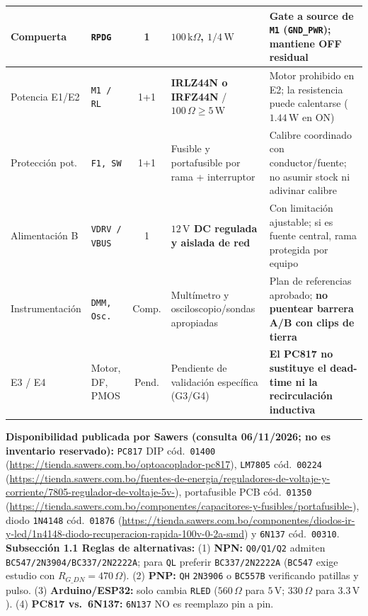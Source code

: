 \documentclass[10pt, a4paper, landscape]{article}
\begin{document}
{\begin{tabularx}{\linewidth}{|>{\raggedright\arraybackslash}p{2.5cm}|>{\raggedright\arraybackslash}p{2.2cm}|c|>{\raggedright\arraybackslash}p{7.4cm}|>{\raggedright\arraybackslash}X|}
Compuerta & \texttt{RPDG} & 1 & \textbf{$100\,\text{k}\Omega$, $1/4\,\text{W}$} & Gate a source de \texttt{M1} (\texttt{GND\_PWR}); mantiene OFF residual \\ \hline
Potencia E1/E2 & \texttt{M1 / RL} & 1+1 & \textbf{IRLZ44N o IRFZ44N} / \textbf{$100\,\Omega \ge 5\,\text{W}$} & Motor prohibido en E2; la resistencia puede calentarse ($1.44\,\text{W}$ en ON) \\ \hline
Protección pot. & \texttt{F1, SW} & 1+1 & Fusible y portafusible por rama + interruptor & Calibre coordinado con conductor/fuente; no asumir stock ni adivinar calibre \\ \hline
Alimentación B & \texttt{VDRV / VBUS} & 1 & \textbf{$12\,\text{V}$ DC regulada y aislada de red} & Con limitación ajustable; si es fuente central, rama protegida por equipo \\ \hline
Instrumentación & \texttt{DMM, Osc.} & Comp. & Multímetro y osciloscopio/sondas apropiadas & Plan de referencias aprobado; \textbf{no puentear barrera A/B con clips de tierra} \\ \hline
E3 / E4 & Motor, DF, PMOS & Pend. & Pendiente de validación específica (G3/G4) & \textbf{El PC817 no sustituye el dead-time ni la recirculación inductiva} \\ \hline
\end{tabularx}
}

\vspace{0.12cm}
\noindent
{\footnotesize \textbf{Disponibilidad publicada por Sawers (consulta 06/11/2026; no es inventario reservado):} \texttt{PC817} DIP cód.\ \texttt{01400} (\url{https://tienda.sawers.com.bo/optoacoplador-pc817}), \texttt{LM7805} cód.\ \texttt{00224} (\url{https://tienda.sawers.com.bo/fuentes-de-energia/reguladores-de-voltaje-y-corriente/7805-regulador-de-voltaje-5v-}), portafusible PCB cód.\ \texttt{01350} (\url{https://tienda.sawers.com.bo/componentes/capacitores-y-fusibles/portafusible-}), diodo \texttt{1N4148} cód.\ \texttt{01876} (\url{https://tienda.sawers.com.bo/componentes/diodos-ir-y-led/1n4148-diodo-recuperacion-rapida-100v-0-2a-smd}) y \texttt{6N137} cód.\ \texttt{00310}. \textbf{Subsección 1.1 Reglas de alternativas:} (1) \textbf{NPN:} \texttt{Q0/Q1/Q2} admiten \texttt{BC547/2N3904/BC337/2N2222A}; para \texttt{QL} preferir \texttt{BC337/2N2222A} (\texttt{BC547} exige estudio con $R_{G\_DN}=470\,\Omega$). (2) \textbf{PNP:} \texttt{QH} \texttt{2N3906} o \texttt{BC557B} verificando patillas y pulso. (3) \textbf{Arduino/ESP32:} solo cambia \texttt{RLED} ($560\,\Omega$ para $5\,\text{V}$; $330\,\Omega$ para $3.3\,\text{V}$). (4) \textbf{PC817 vs.\ 6N137:} \texttt{6N137} NO es reemplazo pin a pin.}
\end{document}
